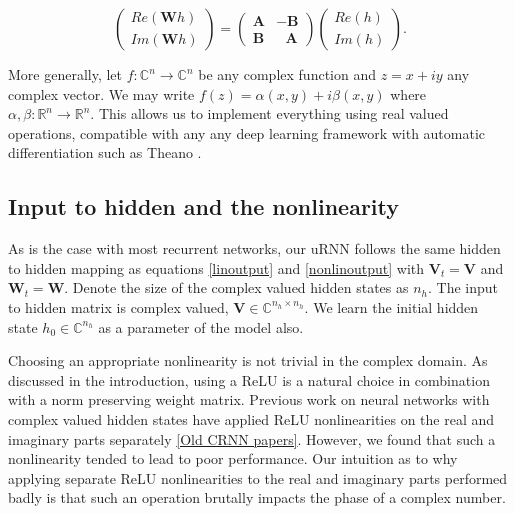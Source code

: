 \documentclass{article} %
\newcommand{\matr}[1]{\mathbf{#1}}
\newcommand\RR{\mathbb{R}}
\newcommand\CC{\mathbb{C}}
\begin{document}
\begin{equation} \begin{pmatrix} Re(\matr{W}h) \\ Im(\matr{W}h) \end{pmatrix}  
= \begin{pmatrix} \matr{A} & -\matr{B} \\ \matr{B} & \ \ \ 
\matr{A} \end{pmatrix} \begin{pmatrix} Re(h) \\ Im(h) \end{pmatrix} .
\end{equation}

More generally, let $f: \CC^n \rightarrow \CC^n$ be any complex function and $z = x + i y$ 
any complex vector. We may write $ f(z) = \alpha(x, y) + i \beta(x, y) $ where 
$\alpha, \beta : \RR^n \rightarrow \RR^n$. 
This allows us to implement everything using real valued operations, compatible with any
any deep learning framework with automatic differentiation such as Theano \citep{Fred2010}.

\subsection{Input to hidden and the nonlinearity}

As is the case with most recurrent networks, our uRNN follows the same hidden to hidden mapping as 
equations \ref{linoutput} and \ref{nonlinoutput} with $\matr{V}_t = \matr{V}$ and $\matr{W}_t = \matr{W}$. 
Denote the size of the complex valued hidden states as $n_h$.
The input to hidden matrix is complex valued, $\matr{V} \in \CC^{n_h \times n_h}$. 
We learn the initial hidden state $h_0 \in \CC^{n_h}$ as a parameter of the model also.

Choosing an appropriate nonlinearity is not trivial in the complex domain.
As discussed in the introduction, using a ReLU is a natural choice in combination with a norm preserving
weight matrix. {\color{red}Previous work on neural networks with complex valued} hidden states 
have applied ReLU nonlinearities on the real and imaginary parts separately \ref{Old CRNN papers}.
However, we found that such a nonlinearity {\color{red}tended to lead to} poor performance.
Our intuition as to why applying separate ReLU nonlinearities to the real 
and imaginary parts performed badly is that such an operation brutally impacts the 
phase of a complex number.
\end{document}
